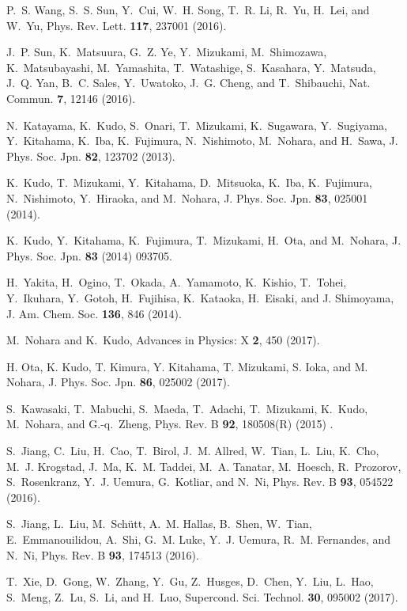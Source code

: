 \documentclass [letter,twocolumn]{jpsj3}
\begin{document}
\begin{thebibliography}{10}
P.~S. Wang, S.~S. Sun, Y.~Cui, W.~H. Song, T.~R. Li, R.~Yu, H.~Lei, and W.~Yu, 
Phys. Rev. Lett. {\bfseries 117},  237001 (2016).

J.~P. Sun, K.~Matsuura, G.~Z. Ye, Y.~Mizukami, M.~Shimozawa, K.~Matsubayashi, M.~Yamashita, T.~Watashige, S.~Kasahara, Y.~Matsuda, J.~Q. Yan, B.~C. Sales, Y.~Uwatoko, J.~G. Cheng, and T.~Shibauchi, 
Nat. Commun. {\bfseries 7}, 12146 (2016).

N.~Katayama, K.~Kudo, S.~Onari, T.~Mizukami, K.~Sugawara, Y.~Sugiyama, Y.~Kitahama, K.~Iba, K.~Fujimura, N.~Nishimoto, M.~Nohara, and H.~Sawa, 
J. Phys. Soc. Jpn. {\bfseries 82}, 123702 (2013).

K.~Kudo, T.~Mizukami, Y.~Kitahama, D.~Mitsuoka, K.~Iba, K.~Fujimura, N.~Nishimoto, Y.~Hiraoka, and M.~Nohara, 
J. Phys. Soc. Jpn. {\bfseries 83}, 025001 (2014).

K.~Kudo, Y.~Kitahama, K.~Fujimura, T.~Mizukami, H.~Ota, and M.~Nohara, 
 J. Phys. Soc. Jpn. {\bfseries 83} (2014) 093705.

H.~Yakita, H.~Ogino, T.~Okada, A.~Yamamoto, K.~Kishio, T.~Tohei, Y.~Ikuhara, Y.~Gotoh, H.~Fujihisa, K.~Kataoka, H.~Eisaki, and J. Shimoyama, 
J. Am. Chem. Soc. {\bfseries 136}, 846 (2014).

M.~Nohara and K.~Kudo, 
Advances in Physics: X {\bfseries 2}, 450 (2017). 

H. Ota, K. Kudo, T. Kimura, Y. Kitahama, T. Mizukami, S. Ioka, and M. Nohara, 
J. Phys. Soc. Jpn. {\bfseries 86},  025002 (2017). 

S.~Kawasaki, T.~Mabuchi, S.~Maeda, T.~Adachi, T.~Mizukami, K.~Kudo, M.~Nohara, and G.-q.~Zheng, 
Phys. Rev. B {\bfseries 92}, 180508(R) (2015) .

S.~Jiang, C.~Liu, H.~Cao, T.~Birol, J.~M. Allred, W.~Tian, L.~Liu, K.~Cho, M.~J. Krogstad, J.~Ma, K.~M. Taddei, M.~A. Tanatar, M.~Hoesch, R.~Prozorov, S.~Rosenkranz, Y.~J. Uemura, G.~Kotliar, and N.~Ni, 
Phys. Rev. B {\bfseries 93}, 054522 (2016).

S.~Jiang, L.~Liu, M.~Sch\"utt, A.~M. Hallas, B.~Shen, W.~Tian, E.~Emmanouilidou, A.~Shi, G.~M. Luke, Y.~J. Uemura, R.~M. Fernandes, and N.~Ni, 
Phys. Rev. B {\bfseries 93}, 174513 (2016).

T.~Xie, D.~Gong, W.~Zhang, Y.~Gu, Z.~Husges, D.~Chen, Y.~Liu, L.~Hao, S.~Meng, Z.~Lu, S.~Li, and H.~Luo, 
Supercond. Sci. Technol. {\bfseries 30}, 095002 (2017).


\end{thebibliography}
\end{document}
